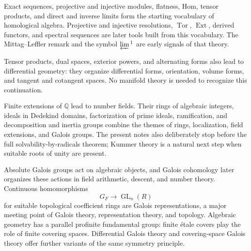
Exact sequences, projective and injective modules, flatness, Hom, tensor
products, and direct and inverse limits form the starting vocabulary of
homological algebra.  Projective and injective resolutions, \(\operatorname{Tor}\),
\(\operatorname{Ext}\), derived functors, and spectral sequences are later
tools built from this vocabulary.  The Mittag--Leffler remark and the symbol
\(\varprojlim{}^1\) are early signals of that theory.

Tensor products, dual spaces, exterior powers, and alternating forms also
lead to differential geometry: they organize differential forms, orientation,
volume forms, and tangent and cotangent spaces.  No manifold theory is needed
to recognize this continuation.


Finite extensions of \(\mathbb Q\) lead to number fields.  Their rings of
algebraic integers, ideals in Dedekind domains, factorization of prime ideals,
ramification, and decomposition and inertia groups combine the themes of
rings, localization, field extensions, and Galois groups.  The present notes
also deliberately stop before the full solvability-by-radicals theorem;
Kummer theory is a natural next step when suitable roots of unity are present.

Absolute Galois groups act on algebraic objects, and Galois cohomology later
organizes these actions in field arithmetic, descent, and number theory.
Continuous homomorphisms
\[
G_F\longrightarrow\operatorname{GL}_n(R)
\]
for suitable topological coefficient rings are Galois representations, a
major meeting point of Galois theory, representation theory, and topology.
Algebraic geometry has a parallel profinite fundamental group: finite
\'etale covers play the role of finite covering spaces.  Differential Galois
theory and covering-space Galois theory offer further variants of the same
symmetry principle.


